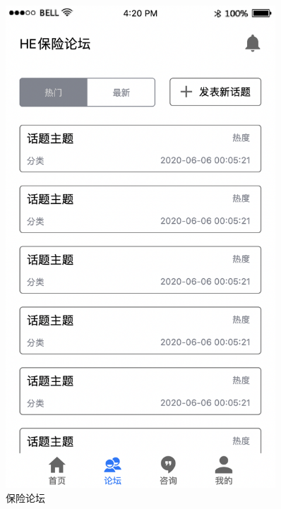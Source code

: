 \documentclass[a4paper]{ctexart}
\begin{document}
\begin{figure}[H]
\begin{minipage}[t]{0.3\textwidth}
  \includegraphics[width=0.9\textwidth]{prototype3}
  \caption{保险论坛}
  \end{minipage}
\end{figure}
\end{document}
